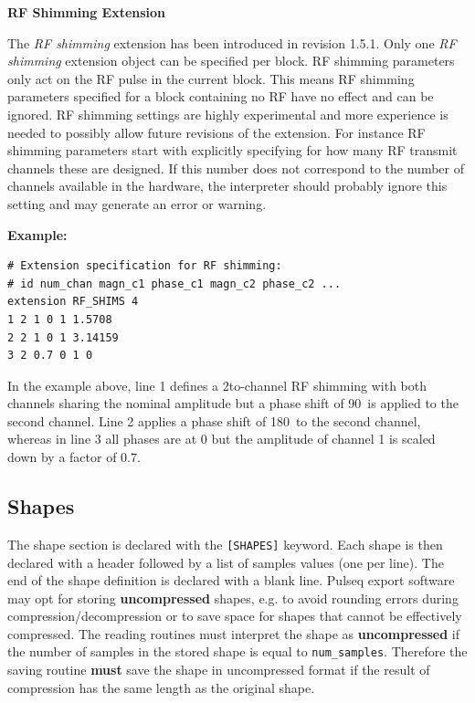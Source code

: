 \documentclass{article}
\begin{document}
\textbf{RF Shimming Extension}

The \textit{RF shimming} extension has been introduced in revision 1.5.1. Only one \textit{RF shimming} extension object can be specified per block. RF shimming parameters only act on the RF pulse in the current block. This means RF shimming parameters specified for a block containing no RF have no effect and can be ignored. RF shimming settings are highly experimental and more experience is needed to possibly allow future revisions of the extension. For instance RF shimming parameters start with explicitly specifying for how many RF transmit channels these are designed. If this number does not correspond to the number of channels available in the hardware, the interpreter should probably ignore this setting and may generate an error or warning.

\begin{minipage}{\textwidth}
\textbf{Example:}
\begin{lstlisting}
# Extension specification for RF shimming:
# id num_chan magn_c1 phase_c1 magn_c2 phase_c2 ...
extension RF_SHIMS 4
1 2 1 0 1 1.5708
2 2 1 0 1 3.14159
3 2 0.7 0 1 0
\end{lstlisting}
\end{minipage}

In the example above, line 1 defines a 2to-channel RF shimming with both channels sharing the nominal amplitude but a phase shift of 90\textdegree\, is applied to the second channel. Line 2 applies a phase shift of 180\textdegree\, to the second channel, whereas in line 3 all phases are at 0 but the amplitude of channel 1 is scaled down by a factor of $0.7$.

\subsection{Shapes}

The shape section is declared with the \verb.[SHAPES]. keyword. Each shape is then declared with a header followed by a list of samples values (one per line). The end of the shape definition is declared with a blank line. Pulseq export software may opt for storing \textbf{uncompressed} shapes, e.g. to avoid rounding errors during compression/decompression or to save space for shapes that cannot be effectively compressed. The reading routines must interpret the shape as \textbf{uncompressed} if the number of samples in the stored shape is equal to \verb.num_samples.. Therefore the saving routine \textbf{must} save the shape in uncompressed format if the result of compression has the same length as the original shape.
\end{document}
